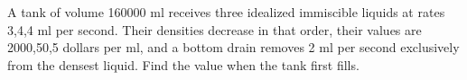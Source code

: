 A tank of volume 160000 ml receives three idealized immiscible liquids at rates 3,4,4 ml per second. Their densities decrease in that order, their values are 2000,50,5 dollars per ml, and a bottom drain removes 2 ml per second exclusively from the densest liquid. Find the value when the tank first fills.
